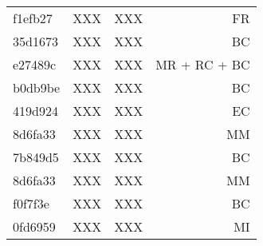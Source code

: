 {\begin{table*}[t]
\begin{tabular}{ l r r r }
		f1efb27 & XXX & XXX & FR \\
		35d1673 & XXX & XXX & BC \\
		e27489c & XXX & XXX & MR + RC + BC \\
		b0db9be & XXX & XXX & BC \\
		419d924 & XXX & XXX & EC \\
		8d6fa33 & XXX & XXX & MM \\
		7b849d5 & XXX & XXX & BC \\
		8d6fa33 & XXX & XXX & MM \\
		f0f7f3e & XXX & XXX & BC \\
		0fd6959 & XXX & XXX & MI \\
		\bottomrule
	\end{tabular}
\end{table*}
}

